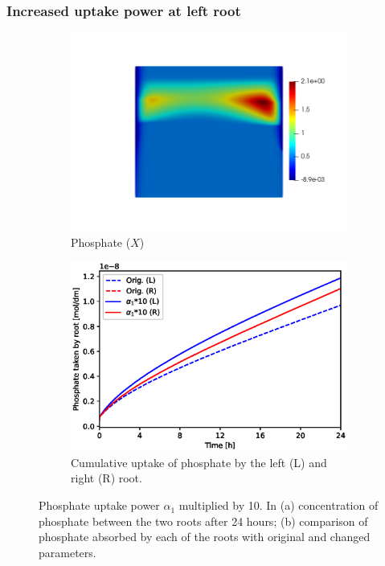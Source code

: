 \documentclass[11pt]{article}
\begin{document}
\FloatBarrier
\subsubsection{Increased uptake power at left root}
\begin{figure}[!htb]
\centering
\begin{subfigure}[t]{0.45\textwidth}
    \includegraphics[trim= 100 100 60 100,width=\textwidth]{Figures/X_alpha1times10.png}
    \caption{Phosphate ($X$)}
\end{subfigure}
\qquad
\begin{subfigure}[t]{0.45\textwidth}
    \includegraphics[width=\textwidth]{Figures/alpha1times10.eps}
    \caption{Cumulative uptake of phosphate by the left (L) and right (R) root.}
\end{subfigure}

\caption{Phosphate uptake power $\alpha_1$ multiplied by 10. In (a) concentration of phosphate between the two roots after 24 hours; (b) comparison of phosphate absorbed by each of the roots with original and changed parameters.}
\end{figure}
\end{document}
